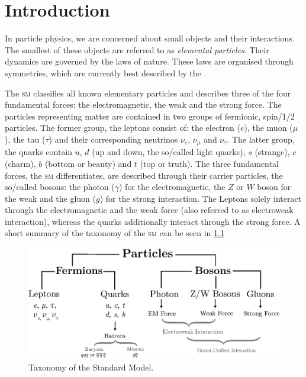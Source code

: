 \documentclass[../../index.tex]{subfiles}
\begin{document}
\chapter{Introduction}
In particle physics, we are concerned about small objects and their
interactions. The smallest of these objects are referred to as \textit{elemental
  particles}. Their dynamics are governed by the laws of nature. These laws are
organised through symmetries, which are currently best described by the
.

The \textsc{sm} classifies all known elementary particles and describes three of
the four fundamental forces: the electromagnetic, the weak and the strong force.
The particles representing matter are contained in two groups of fermionic,
spin\-/1/2 particles. The former group, the leptons consist of: the electron
(\(e\)), the muon (\(\mu\)), the tau (\(\tau\)) and their corresponding
neutrinos \(\nu_e\), \(\nu_\mu\) and \(\nu_\tau\). The latter group, the quarks
contain \(u\), \(d\) (up and down, the so\-/called light quarks), \(s\)
(strange), \(c\) (charm), \(b\) (bottom or beauty) and \(t\) (top or truth). The
three fundamental forces, the \textsc{sm} differentiates, are described through
their carrier particles, the so\-/called bosons: the photon (\(\gamma\)) for the
electromagnetic, the \(Z\) or \(W\) boson for the weak and the gluon (\(g\)) for
the strong interaction. The Leptons solely interact through the electromagnetic
and the weak force (also referred to as electroweak interaction), whereas the
quarks additionally interact through the strong force. A short summary of the
taxonomy of the \textsc{sm} can be seen in \cref{fig:SMTaxonomy}
\begin{figure}
  \centering
  \includegraphics[width=\textwidth]{./images/standardModelTaxonomy.eps}
  \caption{Taxonomy of the Standard Model.}
  \label{fig:SMTaxonomy}
\end{figure}
\end{document}
